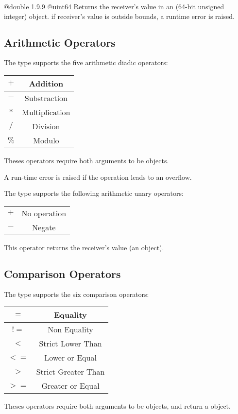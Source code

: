 {@double}
{1.9.9}
{@uint64}
{Returns the receiver's value in an  (64-bit unsigned integer) object.}
{if receiver's value is outside  bounds, a runtime error is raised.}




\subsection{Arithmetic Operators}

The  type supports the five arithmetic diadic operators:\newline

\begin{tabular}{|c|c|}
\hline
$+$ & Addition \\
\hline
$-$ & Substraction \\
\hline
$*$ & Multiplication \\
\hline
$/$ & Division \\
\hline
$\%$ & Modulo \\
\hline
\end{tabular}

Theses operators require both arguments to be  objects.\newline

A run-time error is raised if the operation leads to an overflow.

The  type supports the following arithmetic unary operators:\newline

\begin{tabular}{|c|c|}
\hline
$+$ & No operation \\
$-$ & Negate \\
\hline
\end{tabular}

This operator returns the receiver's value (an  object).






\subsection{Comparison Operators}

The  type supports the six comparison operators:\newline

\begin{tabular}{|c|c|}
\hline
$=$ & Equality \\
\hline
$!=$ & Non Equality \\
\hline
$<$  & Strict Lower Than \\
\hline
$<=$  & Lower or Equal \\
\hline
$>$  & Strict Greater Than \\
\hline
$>=$  & Greater or Equal \\
\hline
\end{tabular}

Theses operators require both arguments to be  objects, and return a  object.


